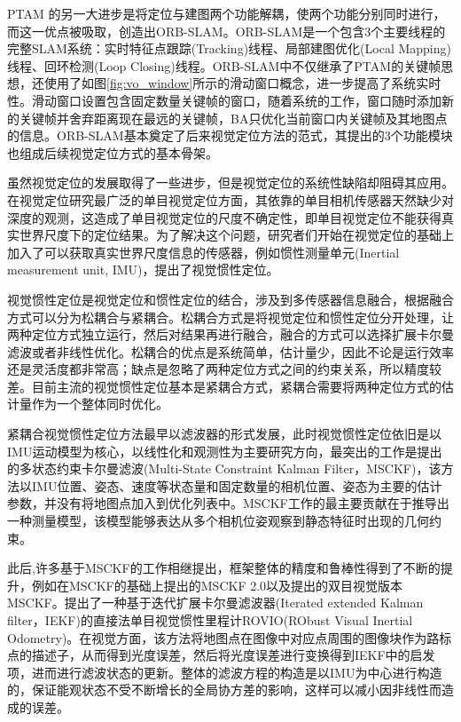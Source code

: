 PTAM 的另一大进步是将定位与建图两个功能解耦，使两个功能分别同时进行，而这一优点被\citet{mur2015orb,mur2017orb}吸取，创造出ORB-SLAM。ORB-SLAM是一个包含3个主要线程的完整SLAM系统：实时特征点跟踪(Tracking)线程、局部建图优化(Local Mapping)线程、回环检测(Loop Closing)线程。ORB-SLAM中不仅继承了PTAM的关键帧思想，还使用了如图\ref{fig:vo_window}所示的滑动窗口概念，进一步提高了系统实时性。滑动窗口设置包含固定数量关键帧的窗口，随着系统的工作，窗口随时添加新的关键帧并舍弃距离现在最远的关键帧，BA只优化当前窗口内关键帧及其地图点的信息。ORB-SLAM基本奠定了后来视觉定位方法的范式，其提出的3个功能模块也组成后续视觉定位方式的基本骨架。

虽然视觉定位的发展取得了一些进步，但是视觉定位的系统性缺陷却阻碍其应用。在视觉定位研究最广泛的单目视觉定位方面，其依靠的单目相机传感器天然缺少对深度的观测，这造成了单目视觉定位的尺度不确定性，即单目视觉定位不能获得真实世界尺度下的定位结果。为了解决这个问题，研究者们开始在视觉定位的基础上加入了可以获取真实世界尺度信息的传感器，例如惯性测量单元(Inertial measurement unit, IMU)，提出了视觉惯性定位。

视觉惯性定位是视觉定位和惯性定位的结合，涉及到多传感器信息融合，根据融合方式可以分为松耦合\cite{lynen2013robust}与紧耦合\cite{falquez2016inertial}。松耦合方式是将视觉定位和惯性定位分开处理，让两种定位方式独立运行，然后对结果再进行融合，融合的方式可以选择扩展卡尔曼滤波或者非线性优化。松耦合的优点是系统简单，估计量少，因此不论是运行效率还是灵活度都非常高；缺点是忽略了两种定位方式之间的约束关系，所以精度较差。目前主流的视觉惯性定位基本是紧耦合方式，紧耦合需要将两种定位方式的估计量作为一个整体同时优化。

紧耦合视觉惯性定位方法最早以滤波器的形式发展，此时视觉惯性定位依旧是以IMU运动模型为核心，以线性化和观测性为主要研究方向，最突出的工作是\citet{mourikis2007multi}提出的多状态约束卡尔曼滤波(Multi-State Constraint Kalman Filter，MSCKF)，该方法以IMU位置、姿态、速度等状态量和固定数量的相机位置、姿态为主要的估计参数，并没有将地图点加入到优化列表中。MSCKF工作的最主要贡献在于推导出一种测量模型，该模型能够表达从多个相机位姿观察到静态特征时出现的几何约束。

此后,许多基于MSCKF的工作相继提出，框架整体的精度和鲁棒性得到了不断的提升，例如\citet{li2013high}在MSCKF的基础上提出的MSCKF 2.0以及\citet{sun2018robust}提出的双目视觉版本MSCKF。\citet{bloesch2017iterated}提出了一种基于迭代扩展卡尔曼滤波器(Iterated extended Kalman filter，IEKF)的直接法单目视觉惯性里程计ROVIO(RObust Visual Inertial Odometry)。在视觉方面，该方法将地图点在图像中对应点周围的图像块作为路标点的描述子，从而得到光度误差，然后将光度误差进行变换得到IEKF中的启发项，进而进行滤波状态的更新。整体的滤波方程的构造是以IMU为中心进行构造的，保证能观状态不受不断增长的全局协方差的影响，这样可以减小因非线性而造成的误差。


